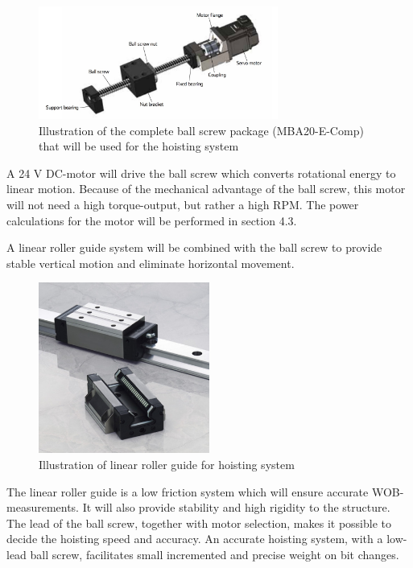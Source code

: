 \begin{figure} [H]
\centering
\includegraphics[width=0.7\textwidth]{figures/CompleteBS.jpeg}
\caption{Illustration of the complete ball screw package (MBA20-E-Comp) that will be used for the hoisting system \cite{aluflex}}
\label{fig:ballscrew}
\end{figure}

A 24 V DC-motor will drive the ball screw which converts rotational energy to linear motion. Because of the mechanical advantage of the ball screw, this motor will not need a high torque-output, but rather a high RPM. The power calculations for the motor will be performed in section 4.3.

A linear roller guide system will be combined with the ball screw to provide stable vertical motion and eliminate horizontal movement.

\begin{figure} [H]
\centering
\includegraphics[width=0.5\textwidth]{figures/rollerguide.jpg}
\caption{Illustration of linear roller guide for hoisting system \cite{pic_rail}}
\label{fig:rollerguide}
\end{figure}


The linear roller guide is a low friction system which will ensure accurate WOB-measurements. It will also provide stability and high rigidity to the structure. The lead of the ball screw, together with motor selection, makes it possible to decide the hoisting speed and accuracy. An accurate hoisting system, with a low-lead ball screw, facilitates small incremented and precise weight on bit changes. 



